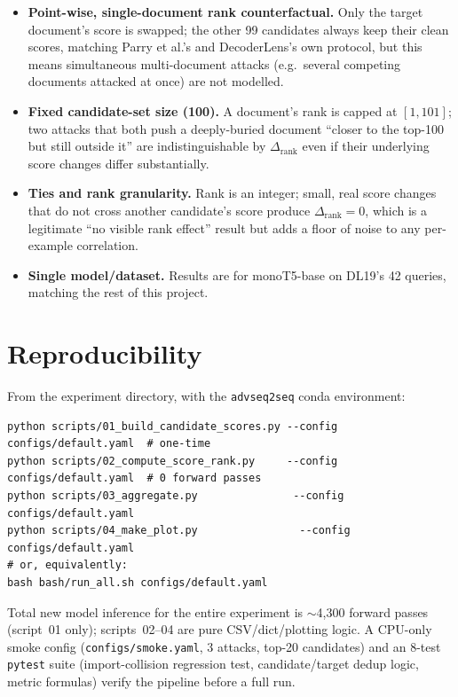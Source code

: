 \documentclass[11pt]{article}
\newcommand{\rank}{\operatorname{rank}}
\begin{document}
\begin{itemize}
  \item \textbf{Point-wise, single-document rank counterfactual.} Only the
        target document's score is swapped; the other 99 candidates always
        keep their clean scores, matching Parry et al.'s and DecoderLens's
        own protocol, but this means simultaneous multi-document attacks
        (e.g.\ several competing documents attacked at once) are not
        modelled.
  \item \textbf{Fixed candidate-set size (100).} A document's rank is
        capped at $[1,101]$; two attacks that both push a deeply-buried
        document ``closer to the top-100 but still outside it'' are
        indistinguishable by $\Delta_{\rank}$ even if their underlying
        score changes differ substantially.
  \item \textbf{Ties and rank granularity.} Rank is an integer; small,
        real score changes that do not cross another candidate's score
        produce $\Delta_{\rank}=0$, which is a legitimate ``no visible
        rank effect'' result but adds a floor of noise to any per-example
        correlation.
  \item \textbf{Single model/dataset.} Results are for monoT5-base on
        DL19's 42 queries, matching the rest of this project.
\end{itemize}

\section{Reproducibility}

From the experiment directory, with the \texttt{advseq2seq} conda
environment:

\begin{lstlisting}
python scripts/01_build_candidate_scores.py --config configs/default.yaml  # one-time
python scripts/02_compute_score_rank.py     --config configs/default.yaml  # 0 forward passes
python scripts/03_aggregate.py               --config configs/default.yaml
python scripts/04_make_plot.py                --config configs/default.yaml
# or, equivalently:
bash bash/run_all.sh configs/default.yaml
\end{lstlisting}

\noindent Total new model inference for the entire experiment is
$\sim$4{,}300 forward passes (script~01 only); scripts~02--04 are pure
CSV/dict/plotting logic. A CPU-only smoke config
(\texttt{configs/smoke.yaml}, 3 attacks, top-20 candidates) and an 8-test
\texttt{pytest} suite (import-collision regression test, candidate/target
dedup logic, metric formulas) verify the pipeline before a full run.
\end{document}
